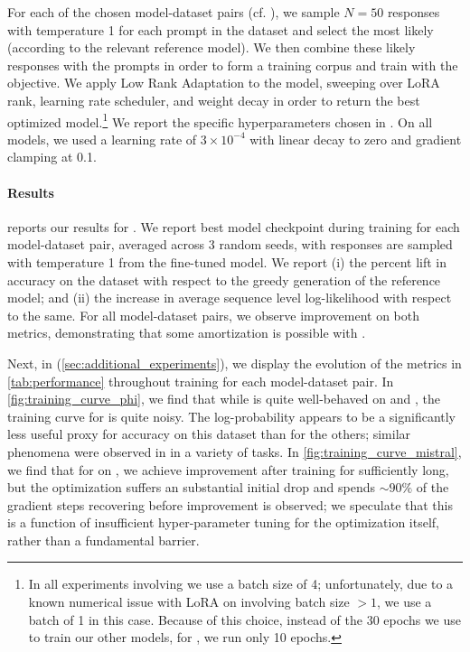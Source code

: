 For each of the chosen model-dataset pairs (cf. ), we sample $N=50$ responses with temperature 1 for each prompt in the dataset and select the most likely (according to the relevant reference model).  We then combine these likely responses with the prompts in order to form a training corpus and train with the \bestofnalg objective. We apply Low Rank Adaptation \citep{hu2021lora} to the model, sweeping over LoRA rank, learning rate scheduler, and weight decay in order to return the best optimized model.\footnote{In all experiments involving \phithreefivemini we use a batch size of 4; unfortunately, due to a known numerical issue with LoRA on \mistral involving batch size $>1$, we use a batch of 1 in this case.  Because of this choice, instead of the 30 epochs we use to train our other models, for \mistral, we run only 10 epochs.}  We report the specific hyperparameters chosen in .  On all models, we used a learning rate of $3 \times 10^{-4}$ with linear decay to zero and gradient clamping at 0.1. \loose

\paragraph{Results}   reports our results for \bestofnalg. We report best model checkpoint during training for each model-dataset pair, averaged across 3 random seeds, with responses are sampled with temperature 1 from the fine-tuned model.  We report (i) the percent lift in accuracy on the dataset with respect to the greedy generation of the reference model; and (ii) the increase in average sequence level log-likelihood with respect to the same. For all model-dataset pairs, we observe improvement on both metrics, demonstrating that some amortization is possible with \bestofnalg.

Next, in  (\cref{sec:additional_experiments}), we display the evolution of the metrics in \cref{tab:performance} throughout training for each model-dataset pair.  In \cref{fig:training_curve_phi}, we find that while \phithreefivemini is quite well-behaved on \mathdataset and \prontoqa, the training curve for \gsm is quite noisy. The log-probability appears to be a significantly less useful proxy for accuracy on this dataset than for the others; similar phenomena were observed in \citet{block2023butterfly} in a variety of tasks.  In \cref{fig:training_curve_mistral}, we find that for \mistral on \mathdataset, we achieve improvement after training for sufficiently long, but the optimization suffers an substantial initial drop and spends $\sim90\% $ of the gradient steps recovering before improvement is observed; we speculate that this is a function of insufficient hyper-parameter tuning for the optimization itself, rather than a fundamental barrier.

